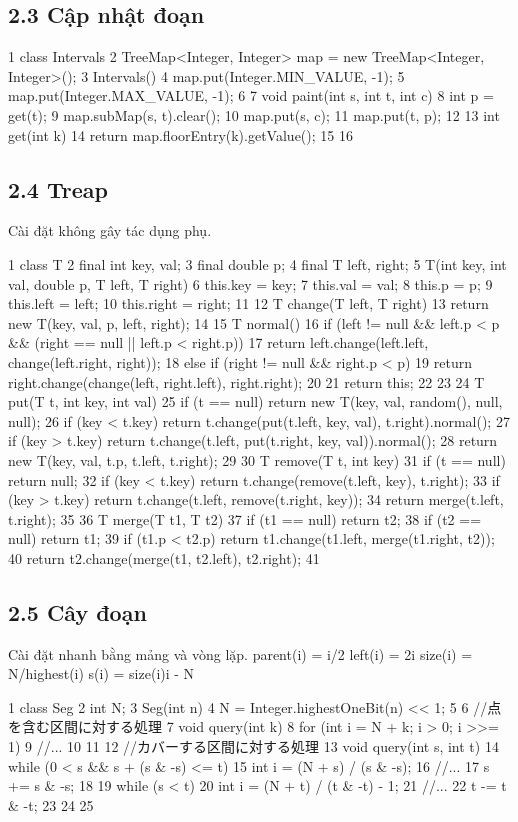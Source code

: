 \documentclass[11pt]{article}
\begin{document}
\subsection{2.3 Cập nhật đoạn}
\begin{Code}
1 class Intervals {
2 TreeMap<Integer, Integer> map = new TreeMap<Integer, Integer>();
3 Intervals() {
4 map.put(Integer.MIN_VALUE, -1);
5 map.put(Integer.MAX_VALUE, -1);
6 }
7 void paint(int s, int t, int c) {
8 int p = get(t);
9 map.subMap(s, t).clear();
10 map.put(s, c);
11 map.put(t, p);
12 }
13 int get(int k) {
14 return map.floorEntry(k).getValue();
15 }
16 }
\end{Code}
\subsection{2.4 Treap}
\begin{NoteBlock}
Cài đặt không gây tác dụng phụ.
\end{NoteBlock}
\begin{Code}
1 class T {
2 final int key, val;
3 final double p;
4 final T left, right;
5 T(int key, int val, double p, T left, T right) {
6 this.key = key;
7 this.val = val;
8 this.p = p;
9 this.left = left;
10 this.right = right;
11 }
12 T change(T left, T right) {
13 return new T(key, val, p, left, right);
14 }
15 T normal() {
16 if (left != null && left.p < p && (right == null || left.p < right.p)) {
17 return left.change(left.left, change(left.right, right));
18 } else if (right != null && right.p < p) {
19 return right.change(change(left, right.left), right.right);
20 }
21 return this;
22 }
23 }
24 T put(T t, int key, int val) {
25 if (t == null) return new T(key, val, random(), null, null);
26 if (key < t.key) return t.change(put(t.left, key, val), t.right).normal();
27 if (key > t.key) return t.change(t.left, put(t.right, key, val)).normal();
28 return new T(key, val, t.p, t.left, t.right);
29 }
30 T remove(T t, int key) {
31 if (t == null) return null;
32 if (key < t.key) return t.change(remove(t.left, key), t.right);
33 if (key > t.key) return t.change(t.left, remove(t.right, key));
34 return merge(t.left, t.right);
35 }
36 T merge(T t1, T t2) {
37 if (t1 == null) return t2;
38 if (t2 == null) return t1;
39 if (t1.p < t2.p) return t1.change(t1.left, merge(t1.right, t2));
40 return t2.change(merge(t1, t2.left), t2.right);
41 }
\end{Code}
\subsection{2.5 Cây đoạn}
\begin{NoteBlock}
Cài đặt nhanh bằng mảng và vòng lặp.
parent(i) = i/2
left(i) = 2i
size(i) = N/highest(i)
s(i) = size(i)i - N
\end{NoteBlock}
\begin{Code}
1 class Seg {
2 int N;
3 Seg(int n) {
4 N = Integer.highestOneBit(n) << 1;
5 }
6 //点を含む区間に対する処理
7 void query(int k) {
8 for (int i = N + k; i > 0; i >>= 1) {
9 //...
10 }
11 }
12 //カバーする区間に対する処理
13 void query(int s, int t) {
14 while (0 < s && s + (s & -s) <= t) {
15 int i = (N + s) / (s & -s);
16 //...
17 s += s & -s;
18 }
19 while (s < t) {
20 int i = (N + t) / (t & -t) - 1;
21 //...
22 t -= t & -t;
23 }
24 }
25 }
\end{Code}
\end{document}

